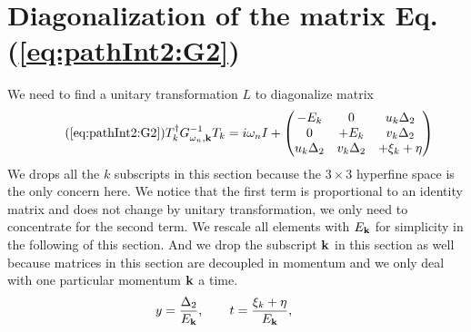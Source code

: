 

\section{Diagonalization of  the matrix Eq. (\ref{eq:pathInt2:G2})\label{sec:diagonalize}}
We need to find a unitary transformation $L$ to diagonalize matrix 
\begin{equation}\tag{\ref{eq:pathInt2:G2}}
T_k^{\dg}G_{\omega_{n},\vk}^{-1}T_k=i\omega_nI+\mtrx{-E_k&0&u_k\Delta_2\\0&+E_k&v_k\Delta_2\\u_k\Delta_2&v_k\Delta_2&+\xi_k+\eta}
\end{equation}
We drops all the $k$ subscripts in this section because the $3\times3$ hyperfine space is the only concern here.  We notice that the first term is proportional to an identity matrix and does not change by unitary transformation, we only need to concentrate for the second term.  We rescale all elements with $E_{\mathbf{k}}$ for simplicity in the following of this section.  And we drop the subscript $\mathbf{k}$ in this section as well because matrices in this section are decoupled in momentum and we only deal with one particular momentum $\mathbf{k}$ a time.
\begin{equation*}
y=\frac{\Delta_2}{E_{\mathbf{k}}},\qquad
 t=\frac{\xi_k+\eta}{E_{\mathbf{k}}},\qquad
\end{equation*}
 
